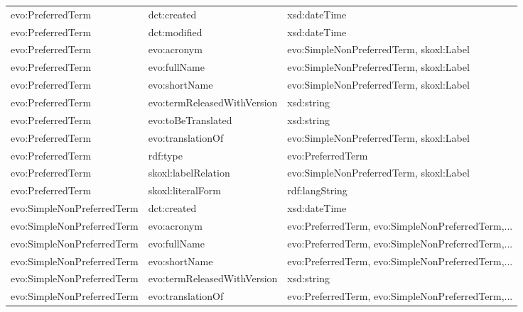 \documentclass[10pt,a4paper,titlepage,final]{article}
\begin{document}
\begin{tabularx}{\textwidth}{llX}
            evo:PreferredTerm &                   dct:created &                                       xsd:dateTime \\
            evo:PreferredTerm &                  dct:modified &                                       xsd:dateTime \\
            evo:PreferredTerm &                   evo:acronym &            evo:SimpleNonPreferredTerm, skoxl:Label \\
            evo:PreferredTerm &                  evo:fullName &            evo:SimpleNonPreferredTerm, skoxl:Label \\
            evo:PreferredTerm &                 evo:shortName &            evo:SimpleNonPreferredTerm, skoxl:Label \\
            evo:PreferredTerm &   evo:termReleasedWithVersion &                                         xsd:string \\
            evo:PreferredTerm &            evo:toBeTranslated &                                         xsd:string \\
            evo:PreferredTerm &             evo:translationOf &            evo:SimpleNonPreferredTerm, skoxl:Label \\
            evo:PreferredTerm &                      rdf:type &                                  evo:PreferredTerm \\
            evo:PreferredTerm &           skoxl:labelRelation &            evo:SimpleNonPreferredTerm, skoxl:Label \\
            evo:PreferredTerm &             skoxl:literalForm &                                     rdf:langString \\
   evo:SimpleNonPreferredTerm &                   dct:created &                                       xsd:dateTime \\
   evo:SimpleNonPreferredTerm &                   evo:acronym &  evo:PreferredTerm, evo:SimpleNonPreferredTerm,... \\
   evo:SimpleNonPreferredTerm &                  evo:fullName &  evo:PreferredTerm, evo:SimpleNonPreferredTerm,... \\
   evo:SimpleNonPreferredTerm &                 evo:shortName &  evo:PreferredTerm, evo:SimpleNonPreferredTerm,... \\
   evo:SimpleNonPreferredTerm &   evo:termReleasedWithVersion &                                         xsd:string \\
   evo:SimpleNonPreferredTerm &             evo:translationOf &  evo:PreferredTerm, evo:SimpleNonPreferredTerm,... \\

\end{tabularx}
\end{document}

